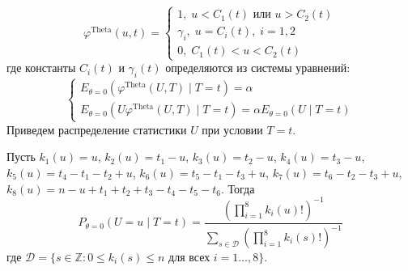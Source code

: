     $$
    \varphi^{\text{Theta}}(u,t)=\begin{cases}
        1, \; u<C_1(t) \text{ или } u>C_2(t)\\
        \gamma_i, \; u=C_i(t), \; i=1,2\\
        0, \; C_1(t)<u<C_2(t)
    \end{cases}
    $$
    где константы $C_i(t)$ и $\gamma_i(t)$ определяются из системы уравнений:
    $$
    \begin{cases}
        E_{\theta=0}(\varphi^{\text{Theta}}(U,T) \mid T=t)=\alpha \\
        E_{\theta=0}(U\varphi^{\text{Theta}}(U,T) \mid T=t)=\alpha E_{\theta=0}(U \mid T=t)
    \end{cases}
    $$
    Приведем распределение статистики $U$ при условии $T=t$.      
    \begin{lemma}\label{u_dist}
        Пусть $k_1(u)=u$, $k_2(u)=t_1-u$, $k_3(u)=t_2-u$, $k_4(u)=t_3-u$, $k_5(u)=t_4-t_1-t_2+u$, $k_6(u)=t_5-t_1-t_3+u$,
        $k_7(u)=t_6 - t_2 - t_3 + u$, $k_8(u)=n-u+t_1+t_2+t_3-t_4-t_5-t_6$.
        Тогда
        $$P_{\theta=0}(U=u \mid T=t)=\dfrac{(\prod_{i=1}^8 k_i(u)!)^{-1}}
            {\sum_{s\in \mathcal{D}} (\prod_{i=1}^8 k_i(s)!)^{-1}}$$
        где $\mathcal{D}=\{s \in \mathbb{Z}: 0\leq k_i(s) \leq n \text{ для всех } i=1\ldots,8\}$.
    \end{lemma}
